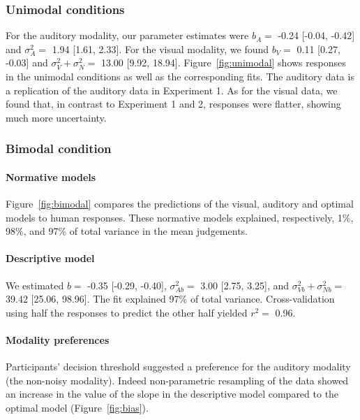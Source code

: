 \documentclass[english,floatsintext,man]{apa6}
\theoremstyle{definition}
\theoremstyle{definition}
\theoremstyle{definition}
\theoremstyle{remark}
\begin{document}
\subsubsection{Unimodal conditions}\label{unimodal-conditions-2}

For the auditory modality, our parameter estimates were \(b_A=\) -0.24
{[}-0.04, -0.42{]} and \(\sigma^2_A=\) 1.94 {[}1.61, 2.33{]}. For the
visual modality, we found \(b_V=\) 0.11 {[}0.27, -0.03{]} and
\(\sigma^2_V+\sigma^2_N=\) 13.00 {[}9.92, 18.94{]}.
Figure~\ref{fig:unimodal} shows responses in the unimodal conditions as
well as the corresponding fits. The auditory data is a replication of
the auditory data in Experiment 1. As for the visual data, we found
that, in contrast to Experiment 1 and 2, responses were flatter, showing
much more uncertainty.

\subsubsection{Bimodal condition}\label{bimodal-condition-3}

\paragraph{Normative models}\label{normative-models-2}

Figure~\ref{fig:bimodal} compares the predictions of the visual,
auditory and optimal models to human responses. These normative models
explained, respectively, 1\%, 98\%, and 97\% of total variance in the
mean judgements.

\paragraph{Descriptive model}\label{descriptive-model-2}

We estimated \(b=\) -0.35 {[}-0.29, -0.40{]}, \(\sigma^2_{Ab}=\) 3.00
{[}2.75, 3.25{]}, and \(\sigma^2_{Vb}+\sigma^2_{Nb}=\) 39.42 {[}25.06,
98.96{]}. The fit explained 97\% of total variance. Cross-validation
using half the responses to predict the other half yielded \(r^2=\)
0.96.

\paragraph{Modality preferences}\label{modality-preferences-1}

Participants' decision threshold suggested a preference for the auditory
modality (the non-noisy modality). Indeed non-parametric resampling of
the data showed an increase in the value of the slope in the descriptive
model compared to the optimal model (Figure~\ref{fig:bias}).
\end{document}
